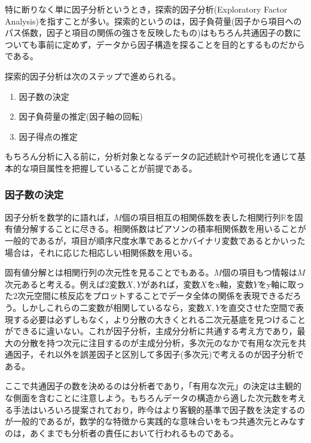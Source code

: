 \documentclass[
  a4paper,
]{ltjsbook}
\providecommand{\tightlist}{%
  \setlength{\itemsep}{0pt}\setlength{\parskip}{0pt}}
\begin{document}
特に断りなく単に因子分析というとき，探索的因子分析(Exploratory Factor
Analysis)を指すことが多い。探索的というのは，因子負荷量(因子から項目へのパス係数，因子と項目の関係の強さを反映したもの)はもちろん共通因子の数についても事前に定めず，データから因子構造を探ることを目的とするものだからである。

探索的因子分析は次のステップで進められる。

\begin{enumerate}
\def\labelenumi{\arabic{enumi}.}
\tightlist
\item
  因子数の決定
\item
  因子負荷量の推定(因子軸の回転)
\item
  因子得点の推定
\end{enumerate}

もちろん分析に入る前に，分析対象となるデータの記述統計や可視化を通じて基本的な項目属性を把握していることが前提である。

\subsubsection{因子数の決定}\label{ux56e0ux5b50ux6570ux306eux6c7aux5b9a}

因子分析を数学的に語れば，\(M\)個の項目相互の相関係数を表した相関行列\(\mathbb{R}\)を固有値分解することに尽きる。相関係数はピアソンの積率相関係数を用いることが一般的であるが，項目が順序尺度水準であるとかバイナリ変数であるとかいった場合は，それに応じた相応しい相関係数を用いる。

固有値分解とは相関行列の次元性を見ることでもある。\(M\)個の項目もつ情報は\(M\)次元あると考える。例えば2変数\(X,Y\)があれば，変数\(X\)をx軸，変数\(Y\)をy軸に取った2次元空間に核反応をプロットすることでデータ全体の関係を表現できるだろう。しかしこれらの二変数が相関しているなら，変数\(X,Y\)を直交させた空間で表現する必要は必ずしもなく，より分散の大きくとれる二次元基底を見つけることができるに違いない。これが因子分析，主成分分析に共通する考え方であり，最大の分散を持つ次元に注目するのが主成分分析，多次元のなかで有用な次元を共通因子，それ以外を誤差因子と区別して多因子(多次元)で考えるのが因子分析である。

ここで共通因子の数を決めるのは分析者であり，「有用な次元」の決定は主観的な側面を含むことに注意しよう。もちろんデータの構造から適した次元数を考える手法はいろいろ提案されており，昨今はより客観的基準で因子数を決定するのが一般的であるが，数学的な特徴から実践的な意味合いをもつ共通次元とみなすのは，あくまでも分析者の責任において行われるものである。
\end{document}
